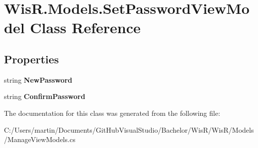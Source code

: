 \hypertarget{class_wis_r_1_1_models_1_1_set_password_view_model}{}\section{Wis\+R.\+Models.\+Set\+Password\+View\+Model Class Reference}
\label{class_wis_r_1_1_models_1_1_set_password_view_model}
\subsection*{Properties}
\begin{DoxyCompactItemize}
\item 
\hypertarget{class_wis_r_1_1_models_1_1_set_password_view_model_acb5f4d4d9a49894a6477887b72a3ac34}{}string {\bfseries New\+Password}\label{class_wis_r_1_1_models_1_1_set_password_view_model_acb5f4d4d9a49894a6477887b72a3ac34}

\item 
\hypertarget{class_wis_r_1_1_models_1_1_set_password_view_model_ac61b76886d35fdf829088ec6aba1bcb8}{}string {\bfseries Confirm\+Password}\label{class_wis_r_1_1_models_1_1_set_password_view_model_ac61b76886d35fdf829088ec6aba1bcb8}

\end{DoxyCompactItemize}


The documentation for this class was generated from the following file\+:\begin{DoxyCompactItemize}
\item 
C\+:/\+Users/martin/\+Documents/\+Git\+Hub\+Visual\+Studio/\+Bachelor/\+Wis\+R/\+Wis\+R/\+Models/Manage\+View\+Models.\+cs\end{DoxyCompactItemize}
